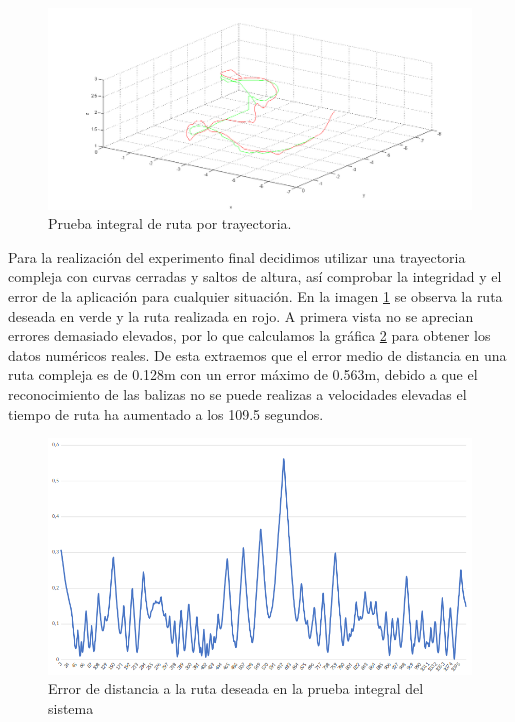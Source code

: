 \begin{figure}[H]
	\begin{center}
		\includegraphics[width=1\textwidth]{imag/IMG43.png}
				\caption{Prueba integral de ruta por trayectoria.}
		\label{fig:Prueba integral de ruta por trayectoria.}	
	\end{center}
\end{figure}

\hspace{1cm} Para la realización del experimento final decidimos utilizar una trayectoria compleja con curvas cerradas y saltos de altura, así comprobar la integridad y el error de la aplicación para cualquier situación. En la imagen \ref{fig:Prueba integral de ruta por trayectoria.} se observa la ruta deseada en verde y la ruta realizada en rojo. A primera vista no se aprecian errores demasiado elevados, por lo que calculamos la gráfica \ref{fig:Error de distancia final.} para obtener los datos numéricos reales. De esta extraemos que el error medio de distancia en una ruta compleja es de 0.128m con un error máximo de 0.563m, debido a que el reconocimiento de las balizas no se puede realizas a velocidades elevadas el tiempo de ruta ha aumentado a los 109.5 segundos.

\begin{figure}[H]
	\begin{center}
		\includegraphics[width=1\textwidth]{imag/IMG44.png}
				\caption{Error de distancia a la ruta deseada en la prueba integral del sistema}
		\label{fig:Error de distancia final.}	
	\end{center}
\end{figure}

